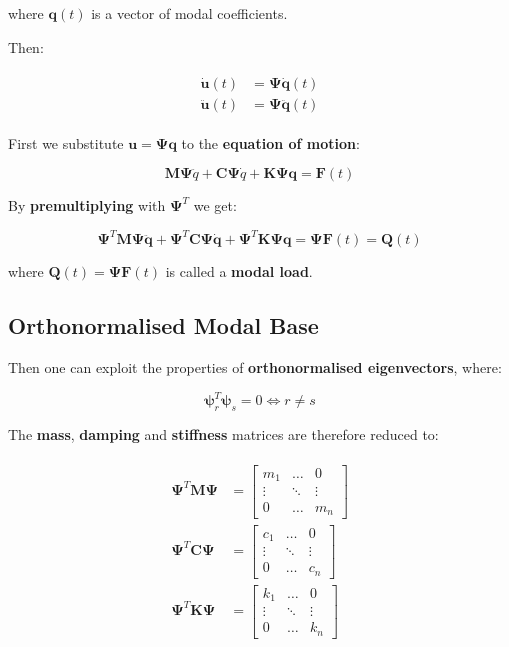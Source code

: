 \documentclass[10pt,b5paper,titlepage]{book}
\newcommand{\m}{\mathbf}
\newcommand{\M}{\pmb}
\newenvironment{eqarray}
{
    \begin{eqnarray}
        \begin{aligned}
}
{
        \end{aligned}
    \end{eqnarray}
}
\begin{document}
where $ \m{q}(t) $ is a vector of modal coefficients.

Then:

\begin{eqarray}
    \dot{\m{u}}(t) &= \M{\Psi} \dot{\m{q}}(t) \\
    \ddot{\m{u}}(t) &= \M{\Psi} \ddot{\m{q}}(t)
\end{eqarray}

First we substitute $ \m{u} = \M{\Psi}\m{q} $ to the
\textbf{equation of motion}:

\begin{equation}
    \m{M} \M{\Psi} \ddot{q} +
    \m{C} \M{\Psi} \dot{q} +
    \m{K}\M{\Psi}\m{q}
    = \m{F}(t)
\end{equation}

By \textbf{premultiplying} with $ \M{\Psi}^T $ we get:

\begin{equation}
    \M{\Psi}^T \m{M} \M{\Psi} \ddot{\m{q}} +
    \M{\Psi}^T \m{C} \M{\Psi} \dot{\m{q}} +
    \M{\Psi}^T \m{K} \M{\Psi} \m{q} =
    \M{\Psi}\m{F}(t) = \m{Q}(t)
\end{equation}

where $ \m{Q}(t) = \M{\Psi} \m{F}(t) $ is called a \textbf{modal load}.

\subsection{Orthonormalised Modal Base}

Then one can exploit the properties of \textbf{orthonormalised eigenvectors}, where:

\begin{equation}
    \M{\psi}_r^T \M{\psi}_s = 0 \Leftrightarrow r \neq s
\end{equation}

The \textbf{mass}, \textbf{damping} and \textbf{stiffness} matrices are therefore
reduced to:

\begin{eqarray}
    \M{\Psi}^T \m{M} \M{\Psi}
    &= \begin{bmatrix}
        m_1 & \dots & 0 \\
        \vdots & \ddots & \vdots \\
        0 & \dots & m_n
    \end{bmatrix} \\
    \M{\Psi}^T \m{C} \M{\Psi}
    &= \begin{bmatrix}
        c_1 & \dots & 0 \\
        \vdots & \ddots & \vdots \\
        0 & \dots & c_n
    \end{bmatrix} \\
    \M{\Psi}^T \m{K} \M{\Psi}
    &= \begin{bmatrix}
        k_1 & \dots & 0 \\
        \vdots & \ddots & \vdots \\
        0 & \dots & k_n
    \end{bmatrix}
\end{eqarray}
\end{document}
